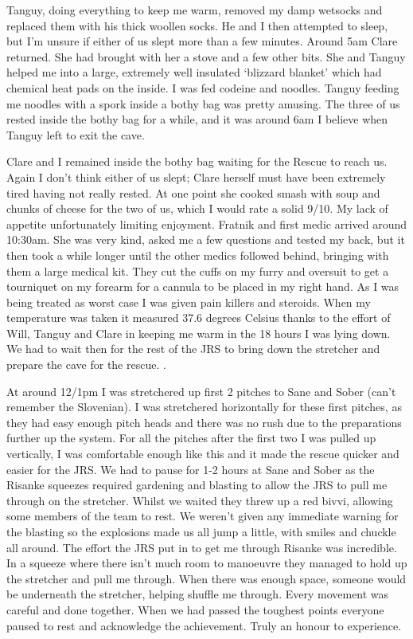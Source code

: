     Tanguy, doing everything to keep me warm, removed my damp wetsocks and replaced them with his thick woollen socks. He and I then attempted to sleep, but I’m unsure if either of us slept more than a few minutes.
    Around 5am Clare returned. She had brought with her a stove and a few other bits. She and Tanguy helped me into a large, extremely well insulated ‘blizzard blanket’ which had chemical heat pads on the inside. I was fed codeine and noodles. Tanguy feeding me noodles with a spork inside a bothy bag was pretty amusing. The three of us rested inside the bothy bag for a while, and it was around 6am I believe when Tanguy left to exit the cave.

    Clare and I remained inside the bothy bag waiting for the Rescue to reach us. Again I don’t think either of us slept; Clare herself must have been extremely tired having not really rested. At one point she cooked smash with soup and chunks of cheese for the two of us, which I would rate a solid 9/10. My lack of appetite unfortunately limiting enjoyment.
    Fratnik and first medic arrived around 10:30am. She was very kind, asked me a few questions and tested my back, but it then took a while longer until the other medics followed behind, bringing with them a large medical kit. They cut the cuffs on my furry and oversuit to get a tourniquet on my forearm for a cannula to be placed in my right hand. As I was being treated as worst case I was given pain killers and steroids. When my temperature was taken it measured 37.6 degrees Celsius thanks to the effort of Will, Tanguy and Clare in keeping me warm in the 18 hours I was lying down.
    We had to wait then for the rest of the JRS to bring down the stretcher and prepare the cave for the rescue. .

    At around 12/1pm I was stretchered up first 2 pitches to Sane and Sober (can’t remember the Slovenian). I was stretchered horizontally for these first pitches, as they had easy enough pitch heads and there was no rush due to the preparations further up the system. For all the pitches after the first two I was pulled up vertically, I was comfortable enough like this and it made the rescue quicker and easier for the JRS. We had to pause for 1-2 hours at Sane and Sober as the Risanke squeezes required gardening and blasting to allow the JRS to pull me through on the stretcher. Whilst we waited they threw up a red bivvi, allowing some members of the team to rest. We weren’t given any immediate warning for the blasting so the explosions made us all jump a little, with smiles and chuckle all around.
    The effort the JRS put in to get me through Risanke was incredible. In a squeeze where there isn’t much room to manoeuvre they managed to hold up the stretcher and pull me through. When there was enough space, someone would be underneath the stretcher, helping shuffle me through. Every movement was careful and done together. When we had passed the toughest points everyone paused to rest and acknowledge the achievement. Truly an honour to experience.

